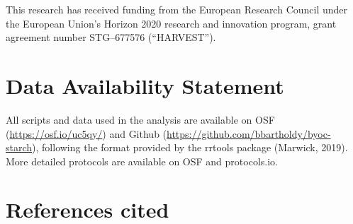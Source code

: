 \documentclass[
]{article}
\begin{document}
This research has received funding from the European Research Council under the
European Union's Horizon 2020 research and innovation program, grant agreement
number STG--677576 (``HARVEST'').

\hypertarget{data-availability-statement}{%
\section*{Data Availability Statement}\label{data-availability-statement}}

All scripts and data used in the analysis are available on OSF
(\url{https://osf.io/uc5qy/}) and Github (\url{https://github.com/bbartholdy/byoc-starch}),
following the format provided by the rrtools package (Marwick, 2019).
More detailed protocols are available on OSF and protocols.io.

\hypertarget{references-cited}{%
\section*{References cited}\label{references-cited}}
\end{document}
